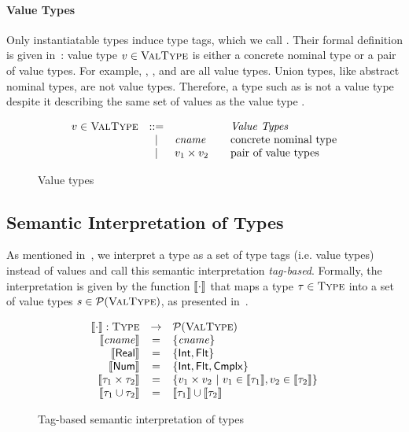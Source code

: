 \paragraph{Value Types}
Only instantiatable types induce type tags,
which we call . 
Their formal definition is given in~:
value type $v \in \textsc{ValType}$ is either a concrete nominal type 
or a pair of value types. 
For example, \tyflt, \typair{\tyint}{\tyint},
and \typair{\tystr}{(\typair{\tyint}{\tyint})} are all value types.
Union types, like abstract nominal types, are not value types.
Therefore, a type such as \tyunion{\tyint}{\tyint} is not a value type 
despite it describing the same set of values as the value type \tyint.

\begin{figure}
	\[
	\begin{array}{rcl@{\qquad}l}
	\vty \in \VType & ::= & & \text{\emph{Value Types}}
	\\ &\Alt& \cname & \text{concrete nominal type}
	\\ &\Alt& \typair{\vty_1}{\vty_2} & \text{pair of value types}
	\end{array}
	\]
	\caption{Value types} %
	\label{fig:bjsem-value-types}
\end{figure}


\subsection{Semantic Interpretation of Types}\label{subsec:interp}

As mentioned in~, 
we interpret a type as a set of type tags (i.e. value types) instead of values
and call this semantic interpretation \emph{tag-based}.
Formally, the interpretation is given by the function
$\llbracket \cdot \rrbracket$ that maps a type $\tau \in \textsc{Type}$
into a set of value types $s \in \mathcal{P}(\textsc{ValType})$,
as presented in~.

\begin{figure}
	\[
	\begin{array}{rcl}
	\llbracket \cdot \rrbracket: \textsc{Type} &\rightarrow& \mathcal{P}(\textsc{ValType}) \\
	\llbracket \mathit{cname} \rrbracket  & = & \{\mathit{cname}\} \\
	\llbracket \mathsf{Real} \rrbracket & = & \{ \mathsf{Int}, \mathsf{Flt} \} \\
	\llbracket \mathsf{Num} \rrbracket & = & \{ \mathsf{Int}, \mathsf{Flt}, \mathsf{Cmplx} \} \\
	\llbracket \tau_1 \times \tau_2 \rrbracket & = & \{v_1 \times v_2 
	~\vert~ v_1 \in \llbracket \tau_1 \rrbracket, v_2 \in \llbracket \tau_2 \rrbracket\}\\
	\llbracket \tau_1 \cup \tau_2 \rrbracket & = & 
	\llbracket \tau_1 \rrbracket \cup \llbracket \tau_2 \rrbracket
	\end{array}
	\]
	\caption{Tag-based semantic interpretation of types} %
	\label{fig:bjsem-interpretation}
\end{figure}

